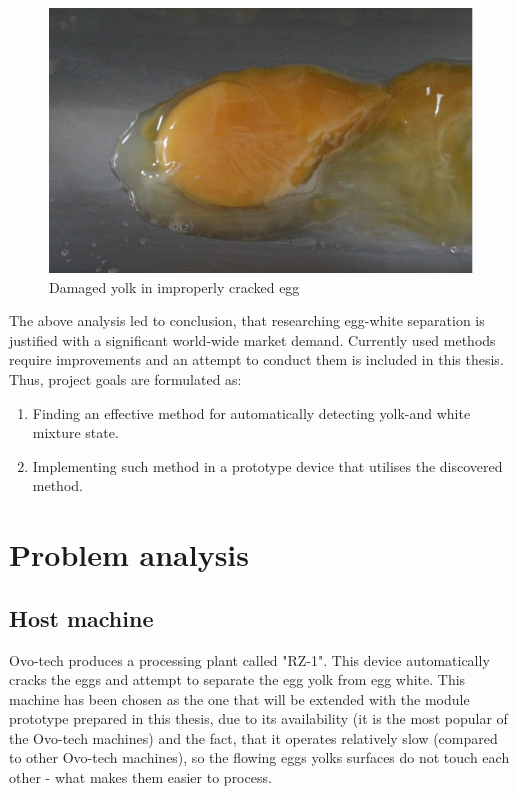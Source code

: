 \documentclass[12pt,twoside,a4paper]{article}
\begin{document}
 
\begin{figure}[H]
\centering
\includegraphics[width=0.4\paperwidth]{damg}
\caption{Damaged yolk in improperly cracked egg}
\end{figure}


The above analysis led to conclusion, that researching egg-white separation is justified with a significant world-wide market demand. Currently used methods require improvements and an attempt to conduct them is included in this thesis. Thus, project goals are formulated as:
\begin{enumerate}
\item Finding an effective method for automatically detecting yolk-and white mixture state.
\item Implementing such method in a prototype device that utilises the discovered method.
\end{enumerate}


\section{Problem analysis}
\subsection{Host machine}
Ovo-tech produces a processing plant called "RZ-1".
This device automatically cracks the eggs and attempt to separate the egg yolk from egg white. This machine has been chosen as the one that will be extended with the module prototype prepared in this thesis, due to its availability (it is the most popular of the Ovo-tech machines) and the fact, that it operates relatively slow (compared to other Ovo-tech machines), so the flowing eggs yolks surfaces do not touch each other - what makes them easier to process.
\end{document}
